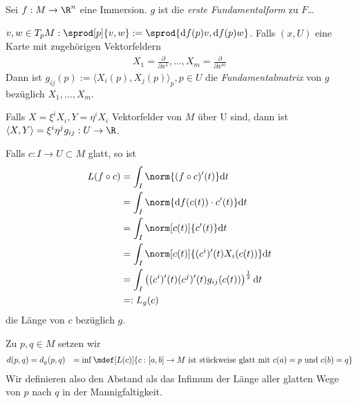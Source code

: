 Sei $f : M \to \R^n$ eine Immersion. $g$ ist die \emph{erste Fundamentalform} zu
$F$\dots

$v,w \in T_p M : \sprod[p]{v,w} := \sprod{\d f(p)v, \d f(p)w}$. Falls
$(x, U)$ eine Karte mit zugehörigen Vektorfeldern
\begin{align}
  X_1 = \frac{\partial}{\partial x^1}, \dots, X_m = \frac{\partial}{\partial x^m}
\end{align}
Dann ist $g_{ij}(p) := \langle X_i(p), X_j(p)\rangle_p, p\in U$ die
\emph{Fundamentalmatrix} von $g$ bezüglich $X_1, \dots, X_m$.

Falls $X = \xi^iX_i, Y = \eta^iX_i$ Vektorfelder von $M$ über U sind, dann ist
$\langle X, Y\rangle = \xi^i\eta^jg_{ij} : U \to \R$.

Falls $c : I \to U \subset M$ glatt, so ist
\begin{align*}
  L(f\circ c) &= \int_I\norm{(f\circ c)'(t)}\d t \\
              &= \int_I\norm{\d f(c(t)) \cdot c'(t)}\d t \\
              &= \int_I\norm[c(t)]{c'(t)} \d t \\
              &= \int_I\norm[c(t)]{(c^i)'(t)X_i(c(t))} \d t \\
              &= \int_I\left( (c^i)'(t)(c^j)'(t)g_{ij}(c(t))
              \right)^{\frac{1}{2}}\d t \\
              &=: L_g(c)
\end{align*}
die Länge von $c$ bezüglich $g$.

Zu $p,q\in M$ setzen wir
\begin{align}
  d(p,q) &= d_g(p,q) &= \inf\mdef[L(c)]{c:[a,b]\to M \text{ ist stückweise glatt
  mit } c(a) = p \text{ und  } c(b) = q}
\end{align}
Wir definieren also den Abstand als das Infimum der Länge aller glatten Wege von
$p$ nach $q$ in der Mannigfaltigkeit.

